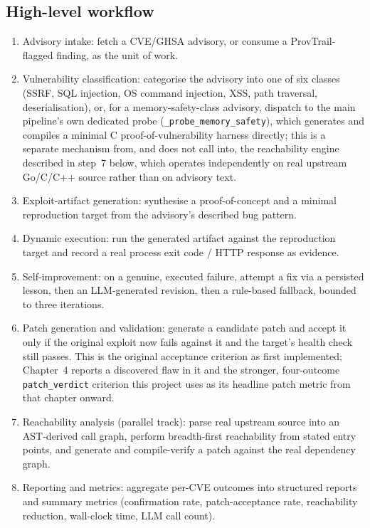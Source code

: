 \documentclass[12pt,a4paper]{report}
\begin{document}
\subsection*{High-level workflow}
\begin{enumerate}
 \item Advisory intake: fetch a CVE/GHSA advisory, or consume a ProvTrail-flagged finding, as the unit of work.
 \item Vulnerability classification: categorise the advisory into one of six classes (SSRF, SQL injection, OS command injection, XSS, path traversal, deserialisation), or, for a memory-safety-class advisory, dispatch to the main pipeline's own dedicated probe (\texttt{\_probe\_memory\_safety}), which generates and compiles a minimal C proof-of-vulnerability harness directly; this is a separate mechanism from, and does not call into, the reachability engine described in step~7 below, which operates independently on real upstream Go/C/C++ source rather than on advisory text.
 \item Exploit-artifact generation: synthesise a proof-of-concept and a minimal reproduction target from the advisory's described bug pattern.
 \item Dynamic execution: run the generated artifact against the reproduction target and record a real process exit code / HTTP response as evidence.
 \item Self-improvement: on a genuine, executed failure, attempt a fix via a persisted lesson, then an LLM-generated revision, then a rule-based fallback, bounded to three iterations.
 \item Patch generation and validation: generate a candidate patch and accept it only if the original exploit now fails against it and the target's health check still passes. This is the original acceptance criterion as first implemented; Chapter~4 reports a discovered flaw in it and the stronger, four-outcome \texttt{patch\_verdict} criterion this project uses as its headline patch metric from that chapter onward.
 \item Reachability analysis (parallel track): parse real upstream source into an AST-derived call graph, perform breadth-first reachability from stated entry points, and generate and compile-verify a patch against the real dependency graph.
 \item Reporting and metrics: aggregate per-CVE outcomes into structured reports and summary metrics (confirmation rate, patch-acceptance rate, reachability reduction, wall-clock time, LLM call count).
\end{enumerate}
\end{document}
